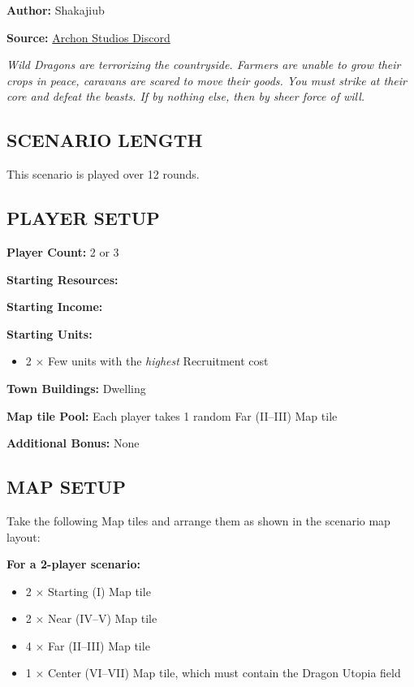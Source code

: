
\begin{multicols*}{2}

\textbf{Author:} Shakajiub

\textbf{Source:} \href{https://discord.com/channels/740870068178649108/1237891632448278618}{Archon Studios Discord}

\textit{Wild Dragons are terrorizing the countryside. Farmers are unable to grow their crops in peace, caravans are scared to move their goods. You must strike at their core and defeat the beasts. If by nothing else, then by sheer force of will.}

\subsection*{\MakeUppercase{Scenario Length}}
This scenario is played over 12 rounds.

\subsection*{\MakeUppercase{Player Setup}}
\textbf{Player Count:} 2 or 3

\textbf{Starting Resources:}\par
{}

\textbf{Starting Income:}\par
{}

\textbf{Starting Units:}
\begin{itemize}
  \item 2 × Few  units with the \textit{highest} Recruitment cost
\end{itemize}

\textbf{Town Buildings:}  Dwelling

\textbf{Map tile Pool:} Each player takes 1 random Far (II--III) Map tile

\textbf{Additional Bonus:} None

\subsection*{\MakeUppercase{Map Setup}}
Take the following Map tiles and arrange them as shown in the scenario map layout:

\textbf{For a 2-player scenario:}
\begin{itemize}
  \item 2 × Starting (I) Map tile
  \item 2 × Near (IV--V) Map tile
  \item 4 × Far (II--III) Map tile
  \item 1 × Center (VI--VII) Map tile, which must contain the Dragon Utopia field
\end{itemize}


\end{multicols*}
